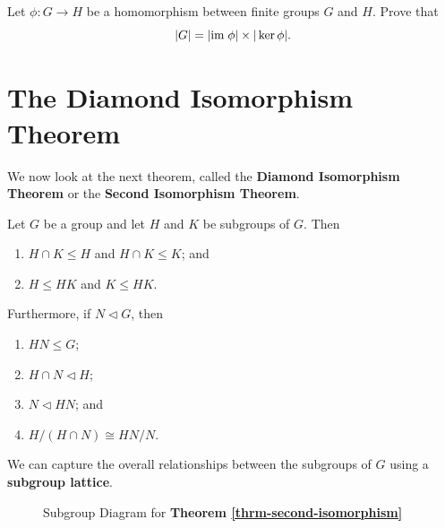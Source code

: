 \begin{exercise}
    Let $\phi: G \to H$ be a homomorphism between finite groups $G$ and $H$. Prove that
    \[
        |G| = |\mathrm{im}\; \phi|\times|\ker \phi|.
    \]
\end{exercise}

\section{The Diamond Isomorphism Theorem}
We now look at the next theorem, called the \textbf{Diamond Isomorphism Theorem} or the \textbf{Second Isomorphism Theorem}.
\begin{theorem}\label{thrm-second-isomorphism}
    Let $G$ be a group and let $H$ and $K$ be subgroups of $G$. Then
    \begin{enumerate}
        \item $H \cap K \leq H$ and $H \cap K \leq K$; and
        \item $H \leq HK$ and $K \leq HK$.
    \end{enumerate}
    Furthermore, if $N \lhd G$, then
    \begin{enumerate}[start=3]
        \item $HN \leq G$;
        \item $H \cap N \lhd H$;
        \item $N \lhd HN$; and
        \item $H / (H\cap N) \cong HN / N$.
    \end{enumerate}
\end{theorem}
We can capture the overall relationships between the subgroups of $G$ using a \textbf{subgroup lattice}.
\begin{figure}[h]
    \centering
    \caption{Subgroup Diagram for \textbf{Theorem \ref{thrm-second-isomorphism}}}
\end{figure}

